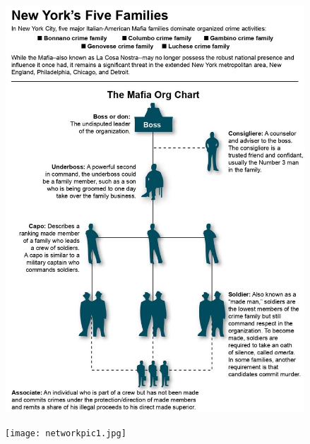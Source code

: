 \documentclass{article}
\begin{document}
\begin{figure}[!ht]
\centering
\includegraphics[width=400pt]{mafia-hierarchy.jpg}
\end{figure}
\newpage
\pagecolor{white}



\begin{figure}[t!]
\vspace{-250pt}
\centering
\texttt{[image: networkpic1.jpg]}
\advance\leftskip-3.52cm
\end{figure}
\end{document}
